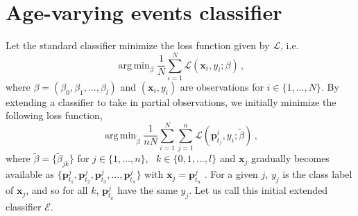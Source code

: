 \documentclass[a4paper,11pt]{article}
\DeclareMathOperator*{\argmin}{arg\,min}
\begin{document}

\section{Age-varying events classifier}\label{sec:ExtendedClassifier}

Let the standard classifier minimize the loss function given by $\mathscr{L}$, i.e.\
$$
  \argmin_\beta \frac{1}{N}\sum_{i=1}^N \mathscr{L}(\bm{x}_i,y_i;\beta) \, ,
$$
where $\beta = \left( \beta_0, \beta_1, \dots, \beta_l \right)$ and $(\bm{x}_i, y_i)$ are observations for $i \in \{ 1, \dots, N \}$. By extending a classifier to take in partial observations, we initially minimize the following loss function,
$$
  \argmin_{\tilde{\beta}} \frac{1}{nN} \sum_{i=1}^N \sum_{j=1}^n \mathscr{L} ( \bm{p}^i_{t_j},y_i;\tilde{\beta}) \, ,
$$
where $\tilde{\beta} = \{ \tilde{\beta}_{jk} \}$ for $j \in \{1, \dots, n\}$, \, $k \in \{0, 1, \dots, l \}$ and $\bm{x}_j$ gradually becomes available as $\{\bm{p}^j_{t_1},\bm{p}^j_{t_2}, \bm{p}^j_{t_3}, \dots, \bm{p}^j_{t_n} \}$ with $\bm{x}_j = \bm{p}_{t_n}^j$ . For a given $j$, $y_j$ is the class label of $\bm{x}_j$, and so for all $k$, $\bm{p}^j_{t_k}$ have the same $y_j$. Let us call this initial extended classifier $\mathscr{E}$.
\end{document}
